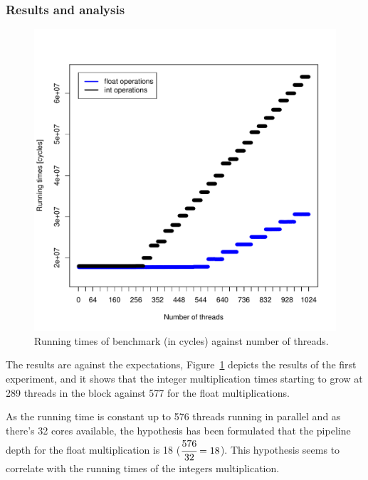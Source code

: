 \documentclass{report}
\def \scalingfactor{.8}
\begin{document}
	\subsubsection{Results and analysis}
    \begin{figure}[H]
    	\centering
	    \includegraphics[width=\scalingfactor\linewidth]{"graphics/float_vs_int_running_times"}
		\vspace{-15pt}
		\captionsetup{justification=centering}
        \caption{Running times of benchmark (in cycles) against number of threads.}
        \label{fig:int_fp_comp}
    \end{figure}
	
    The results are against the expectations, Figure~\ref{fig:int_fp_comp} depicts the results of the first experiment,
    and it shows that the integer multiplication times starting to grow at 289 threads in the block against
    577 for the float multiplications.
    
    As the running time is constant up to 576 threads running in parallel and as there's 32 cores
    available, the hypothesis has been formulated that the pipeline depth for the float multiplication is 18 ($\cfrac{576}{32} = 18$). 
    This hypothesis seems to correlate with the running times of the integers multiplication. 
    
\end{document}
